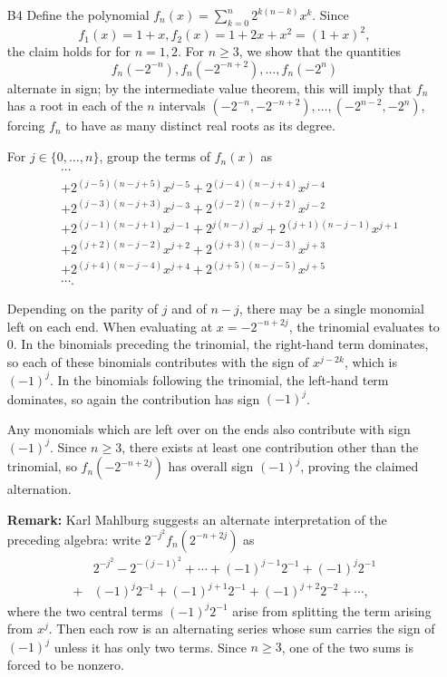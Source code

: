 \documentclass[amssymb,twocolumn,pra,10pt,aps]{revtex4-1}
\begin{document}
\begin{itemize}
\item[B4]
Define the polynomial $f_n(x) = \sum_{k=0}^n 2^{k(n-k)} x^k$.
Since
\[
f_1(x) = 1+x, f_2(x) = 1 + 2x + x^2 = (1+x)^2,
\]
the claim holds for for $n=1,2$. For $n \geq 3$, we show that the quantities
\[
f_n(-2^{-n}), f_n(-2^{-n+2}), \dots, f_n(-2^n)
\]
alternate in sign; by the intermediate value theorem, this will imply that $f_n$ has a root in each of the $n$ intervals $(- 2^{-n}, - 2^{-n+2}), \dots, (- 2^{n-2}, -2^n)$,
forcing $f_n$ to have as many distinct real roots as its degree.

For $j \in \{0,\dots,n\}$, group the terms of $f_n(x)$ as
\begin{align*}
&\cdots \\
&+ 2^{(j-5)(n-j+5)} x^{j-5} + 2^{(j-4)(n-j+4)} x^{j-4} \\
&+ 2^{(j-3)(n-j+3)} x^{j-3} + 2^{(j-2)(n-j+2)} x^{j-2} \\
&+ 2^{(j-1)(n-j+1)} x^{j-1} + 2^{j(n-j)} x^j + 2^{(j+1)(n-j-1)} x^{j+1} \\
&+  2^{(j+2)(n-j-2)} x^{j+2} + 2^{(j+3)(n-j-3)} x^{j+3} \\
&+2^{(j+4)(n-j-4)} x^{j+4} + 2^{(j+5)(n-j-5)} x^{j+5} \\
& \cdots.
\end{align*}

Depending on the parity of $j$ and of $n-j$, there may be a single monomial left on each end. When evaluating at $x =- 2^{-n+2j}$,
the trinomial evaluates to $0$. In the binomials preceding the trinomial, the right-hand term dominates, so each of these binomials contributes with the sign of $x^{j-2k}$, which is $(-1)^j$. In the binomials following the trinomial, the left-hand term dominates, so again the contribution has sign $(-1)^j$.

Any monomials which are left over on the ends also contribute with sign $(-1)^j$. Since $n \geq 3$, there exists at least one contribution other than the trinomial, so $f_n(- 2^{-n+2j})$ has overall sign $(-1)^j$, proving the claimed alternation.

\noindent
\textbf{Remark:} Karl Mahlburg suggests an alternate interpretation of the preceding algebra: write $2^{-j^2} f_n(2^{-n+2j})$ as
\begin{align*}
&2^{-j^2} - 2^{-(j-1)^2} + \cdots + (-1)^{j-1} 2^{-1} + (-1)^j 2^{-1}\\
+ &(-1)^j 2^{-1} + (-1)^{j+1} 2^{-1} + (-1)^{j+2} 2^{-2} + \cdots,
\end{align*}
where the two central terms $(-1)^j 2^{-1}$ arise from splitting the term arising from $x^j$. Then each row is an alternating series whose sum carries the sign of $(-1)^j$ unless it has only two terms. Since $n \geq 3$, one of the two sums is forced to be nonzero.


\end{itemize}
\end{document}
